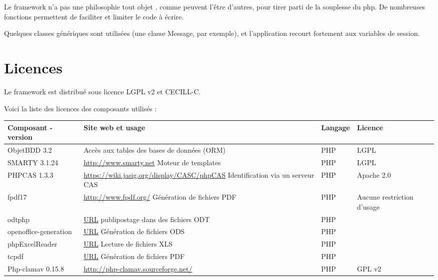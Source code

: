 Le framework n'a pas une philosophie \og tout objet \fg{}, comme peuvent l'être d'autres, pour tirer parti de la souplesse du php. De nombreuses fonctions permettent de faciliter et limiter le code à écrire.

Quelques classes génériques sont utilisées (une classe Message, par exemple), et l'application recourt fortement aux variables de session. 

\section{Licences}

Le framework est distribué sous licence LGPL v2 et CECILL-C.

Voici la liste des licences des composants utilisés :


\begin{longtable}{|>{\raggedright\arraybackslash}p{2cm}|p{7cm}|>{\raggedright\arraybackslash}p{1.5cm}|>{\raggedright\arraybackslash}p{1.5cm}|}
\hline
\textbf{Composant - version} & \textbf{Site web et usage} & \textbf{Langage} & \textbf{Licence} \\
\hline
\endhead
ObjetBDD 3.2 &  Accès aux tables des bases de données (ORM) & PHP & LGPL \\
\hline
SMARTY 3.1.24 & \url{http://www.smarty.net} Moteur de templates & PHP & LGPL \\
\hline
PHPCAS 1.3.3 & \url{https://wiki.jasig.org/display/CASC/phpCAS} Identification via un serveur CAS & PHP & Apache 2.0\\
\hline
fpdf17 & \url{http://www.fpdf.org/} Génération de fichiers PDF & PHP & Aucune restriction d'usage\\
\hline
odtphp & \url{URL}  publipostage dans des fichiers ODT & PHP & \\
\hline
openoffice-generation & \url{URL} Génération de fichiers ODS & PHP & \\
\hline
phpExcelReader & \url{URL} Lecture de fichiers XLS & PHP & \\
\hline
tcpdf & \url{URL} Génération de fichiers PDF & PHP & \\
\hline


Php-clamav 0.15.8 & \url{http://php-clamav.sourceforge.net/} & PHP & GPL v2 \\
\hline


\end{longtable}
